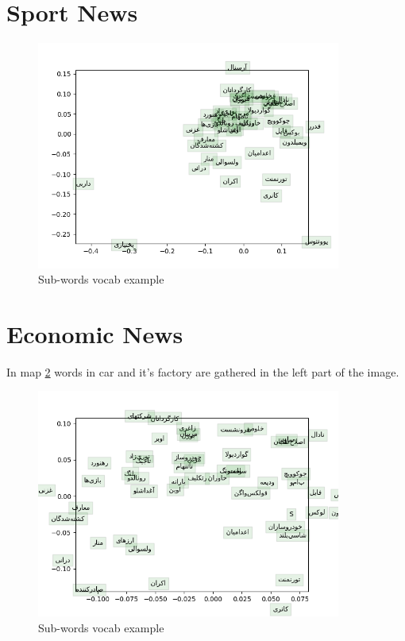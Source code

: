 \section{Sport News}
\begin{figure}[h]
	\centering
	\includegraphics[width=10cm]{../reports/word2vec/word_vectors_ورزش.png}
	\caption{Sub-words vocab example}
	\label{fig:word2vecsport}
\end{figure}


\section{Economic News}
In map \ref{fig:word2vececon} words in car and it's factory are gathered in the left part of the image.
\begin{figure}[h]
	\centering
	\includegraphics[width=10cm]{../reports/word2vec/word_vectors_اقتصاد.png}
	\caption{Sub-words vocab example}
	\label{fig:word2vececon}
\end{figure}

